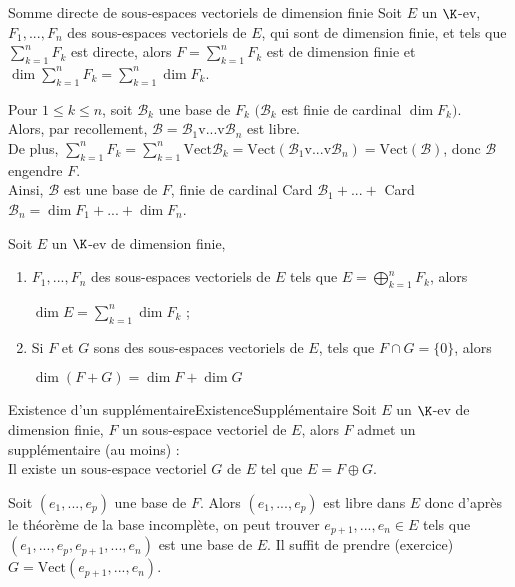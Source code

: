 \documentclass[12pt, a4paper]{report}
\begin{document}
\begin{theoreme}{Somme directe de sous-espaces vectoriels de dimension finie}{}
Soit $E$ un $\K$-ev, $F_1,...,F_n$ des sous-espaces vectoriels de $E$, qui sont de dimension finie, et tels que $\displaystyle{\sum_{k=1}^n F_k}$ est directe, alors $F = \displaystyle{\sum_{k=1}^n F_k}$ est de dimension finie et $\dim \displaystyle{\sum_{k=1}^n F_k} = \displaystyle{\sum_{k=1}^n \dim F_k}$.
\end{theoreme}

\begin{demo}{}
Pour $1 \le k \le n$, soit $\mathcal{B}_k$ une base de $F_k$ $(\mathcal{B}_k$ est finie de cardinal $\dim F_k)$. \\
Alors, par recollement, $\mathcal{B} = \mathcal{B}_1 \text{v} ... \text{v} \mathcal{B}_n$ est libre. \\
De plus, $\displaystyle{\sum_{k=1}^n F_k = \sum_{k=1}^n \text{Vect}\mathcal{B}_k} = \text{Vect}(\mathcal{B}_1 \text{v} ... \text{v} \mathcal{B}_n) = \text{Vect}(\mathcal{B})$, donc $\mathcal{B}$ engendre $F$. \\
Ainsi, $\mathcal{B}$ est une base de $F$, finie de cardinal Card $\mathcal{B}_1 + ... + $ Card $\mathcal{B}_n = \dim F_1 + ... + \dim F_n$.
\end{demo}

\begin{corollaire}{}{}
Soit $E$ un $\K$-ev de dimension finie, 
\begin{enumerate}
	\item $F_1,...,F_n$ des sous-espaces vectoriels de $E$ tels que $E = \displaystyle{\bigoplus_{k=1}^n F_k}$, alors 
	\begin{center}
	$\dim E = \displaystyle{\sum_{k=1}^n \dim F_k}$ ;
	\end{center}
	\item Si $F$ et $G$ sons des sous-espaces vectoriels de $E$, tels que $F \cap G = \{0\}$, alors 
	\begin{center}
	$\dim (F+G) = \dim F + \dim G$
	\end{center}
\end{enumerate}
\end{corollaire}

\begin{remarque}
\begin{theoreme}{Existence d'un supplémentaire}{ExistenceSupplémentaire}
Soit $E$ un $\K$-ev de dimension finie, $F$ un sous-espace vectoriel de $E$, alors $F$ admet un supplémentaire (au moins) : \\
Il existe un sous-espace vectoriel $G$ de $E$ tel que $E = F \oplus G$.
\end{theoreme}

\begin{demo}{}
Soit $(e_1,...,e_p)$ une base de $F$. Alors $(e_1,...,e_p)$ est libre dans $E$ donc d'après le théorème de la base incomplète, on peut trouver $e_{p+1},...,e_n \in E$ tels que $(e_1,...,e_p,e_{p+1},...,e_n)$ est une base de $E$. Il suffit de prendre (exercice) $G = \text{Vect}(e_{p+1},...,e_n)$.
\end{demo}
\end{remarque}
\end{document}
